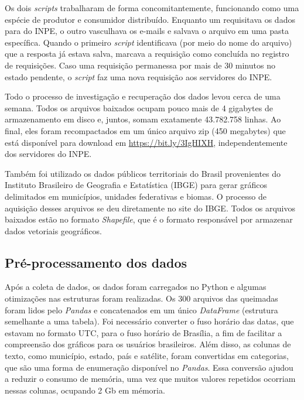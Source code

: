 \documentclass[cic,tc]{iiufrgs}
\begin{document}
Os dois \textit{scripts} trabalharam de forma concomitantemente, funcionando como uma espécie de produtor e consumidor distribuído. Enquanto um requisitava os dados para do INPE, o outro vasculhava os e-mails e salvava o arquivo em uma pasta específica. Quando o primeiro \textit{script} identificava (por meio do nome do arquivo) que a resposta já estava salva, marcava a requisição como concluída no registro de requisições. Caso uma requisição permanessa por mais de 30 minutos no estado pendente, o \textit{script} faz uma nova requisição aos servidores do INPE.

Todo o processo de investigação e recuperação dos dados levou cerca de uma semana. Todos os arquivos baixados ocupam pouco mais de 4 gigabytes de armazenamento em disco e, juntos, somam exatamente 43.782.758 linhas. Ao final, eles foram recompactados em um único arquivo zip (450 megabytes) que está disponível para download em \url{https://bit.ly/3IgHIXH}, independentemente dos servidores do INPE.

Também foi utilizado os dados públicos territoriais do Brasil provenientes do Instituto Brasileiro de Geografia e Estatística (IBGE) para gerar gráficos delimitados em municípios, unidades federativas e biomas. O processo de aquisição desses arquivos se deu diretamente no site do IBGE. Todos os arquivos baixados estão no formato \textit{Shapefile}, que é o formato responsável por armazenar dados vetoriais geográficos.

\subsection*{Pré-processamento dos dados}

Após a coleta de dados, os dados foram carregados no Python e algumas otimizações nas estruturas foram realizadas. Os 300 arquivos das queimadas foram lidos pelo \textit{Pandas} e concatenados em um único \textit{DataFrame} (estrutura semelhante a uma tabela). Foi necessário converter o fuso horário das datas, que estavam no formato UTC, para o fuso horário de Brasília, a fim de facilitar a compreensão dos gráficos para os usuários brasileiros. Além disso, as colunas de texto, como município, estado, país e satélite, foram convertidas em categorias, que são uma forma de enumeração disponível no \textit{Pandas}. Essa conversão ajudou a reduzir o consumo de memória, uma vez que muitos valores repetidos ocorriam nessas colunas, ocupando 2 Gb em mémoria.
\end{document}
